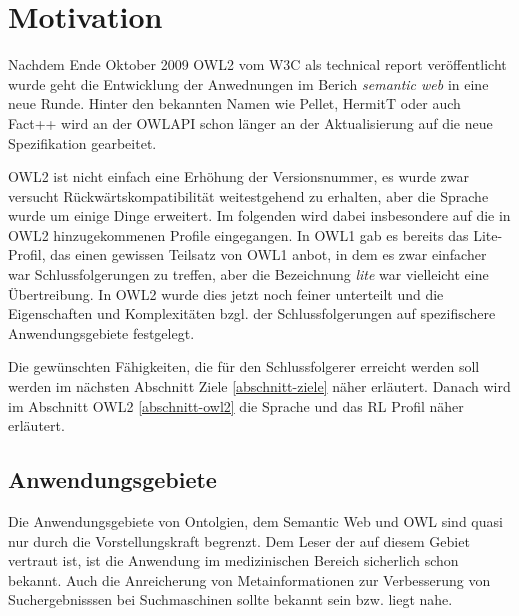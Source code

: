 \chapter{Motivation}
\label{kapitel-motivation}

Nachdem Ende Oktober 2009 OWL2 vom W3C als technical report veröffentlicht wurde geht die Entwicklung der Anwednungen im Berich \emph{semantic web} in eine neue Runde. Hinter den bekannten Namen wie Pellet, HermitT oder auch Fact++ wird an der OWLAPI schon länger an der Aktualisierung auf die neue Spezifikation gearbeitet.

OWL2 ist nicht einfach eine Erhöhung der Versionsnummer, es wurde zwar versucht Rückwärtskompatibilität weitestgehend zu erhalten, aber die Sprache wurde um einige Dinge erweitert. Im folgenden wird dabei  insbesondere auf die in OWL2 hinzugekommenen Profile eingegangen. In OWL1 gab es bereits das Lite-Profil, das einen gewissen Teilsatz von OWL1 anbot, in dem es zwar einfacher war Schlussfolgerungen zu treffen, aber die Bezeichnung \emph{lite} war vielleicht eine Übertreibung. In OWL2 wurde dies jetzt noch feiner unterteilt und die Eigenschaften und Komplexitäten bzgl. der Schlussfolgerungen auf spezifischere Anwendungsgebiete festgelegt.

Die gewünschten Fähigkeiten, die für den Schlussfolgerer erreicht werden soll werden im nächsten Abschnitt Ziele \ref{abschnitt-ziele} näher erläutert. Danach wird im Abschnitt OWL2 \ref{abschnitt-owl2} die Sprache und das RL Profil näher erläutert.

\section{Anwendungsgebiete}
Die Anwendungsgebiete von Ontolgien, dem Semantic Web und OWL sind quasi nur durch die Vorstellungskraft begrenzt. Dem Leser der auf diesem Gebiet vertraut ist, ist die Anwendung im medizinischen Bereich sicherlich schon bekannt. Auch die Anreicherung von Metainformationen zur Verbesserung von Suchergebnisssen bei Suchmaschinen sollte bekannt sein bzw. liegt nahe.

